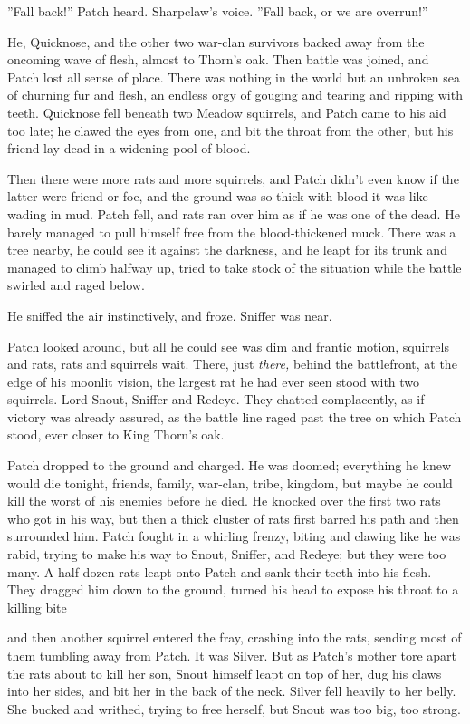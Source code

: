 \documentclass[12pt]{book}
\begin{document}
''Fall back!'' Patch heard. Sharpclaw's voice. ''Fall back, or we are overrun!''

He, Quicknose, and the other two war-clan survivors backed away from the oncoming wave of flesh, almost to Thorn's oak. Then battle was joined, and Patch lost all sense of place. There was nothing in the world but an unbroken sea of churning fur and flesh, an endless orgy of gouging and tearing and ripping with teeth. Quicknose fell beneath two Meadow squirrels, and Patch came to his aid too late; he clawed the eyes from one, and bit the throat from the other, but his friend lay dead in a widening pool of blood.

Then there were more rats and more squirrels, and Patch didn't even know if the latter were friend or foe, and the ground was so thick with blood it was like wading in mud. Patch fell, and rats ran over him as if he was one of the dead. He barely managed to pull himself free from the blood-thickened muck. There was a tree nearby, he could see it against the darkness, and he leapt for its trunk and managed to climb halfway up, tried to take stock of the situation while the battle swirled and raged below.

He sniffed the air instinctively, and froze. Sniffer was near.

Patch looked around, but all he could see was dim and frantic motion, squirrels and rats, rats and squirrels %
wait. There, just {\it there,} behind the battlefront, at the edge of his moonlit vision, the largest rat he had ever seen stood with two squirrels. Lord Snout, Sniffer and Redeye. They chatted complacently, as if victory was already assured, as the battle line raged past the tree on which Patch stood, ever closer to King Thorn's oak.

Patch dropped to the ground and charged. He was doomed; everything he knew would die tonight, friends, family, war-clan, tribe, kingdom, but maybe he could kill the worst of his enemies before he died. He knocked over the first two rats who got in his way, but then a thick cluster of rats first barred his path and then surrounded him. Patch fought in a whirling frenzy, biting and clawing like he was rabid, trying to make his way to Snout, Sniffer, and Redeye; but they were too many. A half-dozen rats leapt onto Patch and sank their teeth into his flesh. They dragged him down to the ground, turned his head to expose his throat to a killing bite %

and then another squirrel entered the fray, crashing into the rats, sending most of them tumbling away from Patch. It was Silver. But as Patch's mother tore apart the rats about to kill her son, Snout himself leapt on top of her, dug his claws into her sides, and bit her in the back of the neck. Silver fell heavily to her belly. She bucked and writhed, trying to free herself, but Snout was too big, too strong.
\end{document}
